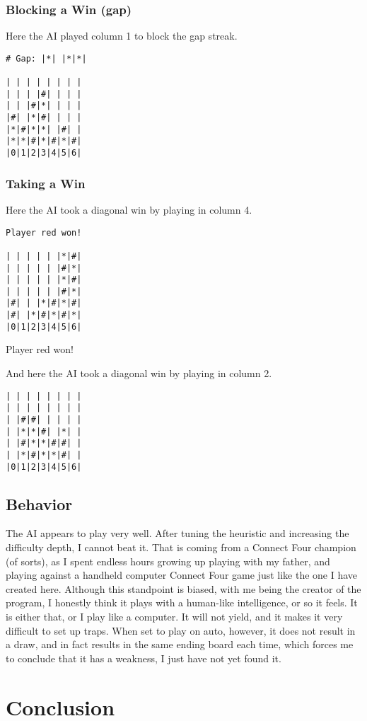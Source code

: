 \documentclass[12pt, article]{scrartcl}
\begin{document}
\subsubsection{Blocking a Win (gap)}
Here the AI played column 1 to block the gap streak.
\begin{verbatim}
# Gap: |*| |*|*|

| | | | | | | |
| | | |#| | | |
| | |#|*| | | |
|#| |*|#| | | |
|*|#|*|*| |#| |
|*|*|#|*|#|*|#|
|0|1|2|3|4|5|6|
\end{verbatim}

\subsubsection{Taking a Win}
Here the AI took a diagonal win by playing in column 4.
\begin{verbatim}
Player red won!

| | | | | |*|#|
| | | | | |#|*|
| | | | | |*|#|
| | | | | |#|*|
|#| | |*|#|*|#|
|#| |*|#|*|#|*|
|0|1|2|3|4|5|6|
\end{verbatim}
Player red won!

And here the AI took a diagonal win by playing in column 2.
\begin{verbatim}
| | | | | | | |
| | | | | | | |
| |#|#| | | | |
| |*|*|#| |*| |
| |#|*|*|#|#| |
| |*|#|*|*|#| |
|0|1|2|3|4|5|6|
\end{verbatim}

\subsection{Behavior}
The AI appears to play very well. After tuning the heuristic and increasing the difficulty depth, I cannot beat it. That is coming from a Connect Four champion (of sorts), as I spent endless hours growing up playing with my father, and playing against a handheld computer Connect Four game just like the one I have created here. Although this standpoint is biased, with me being the creator of the program, I honestly think it plays with a human-like intelligence, or so it feels. It is either that, or I play like a computer. It will not yield, and it makes it very difficult to set up traps. When set to play on auto, however, it does not result in a draw, and in fact results in the same ending board each time, which forces me to conclude that it has a weakness, I just have not yet found it.

\section{Conclusion}
\end{document}
